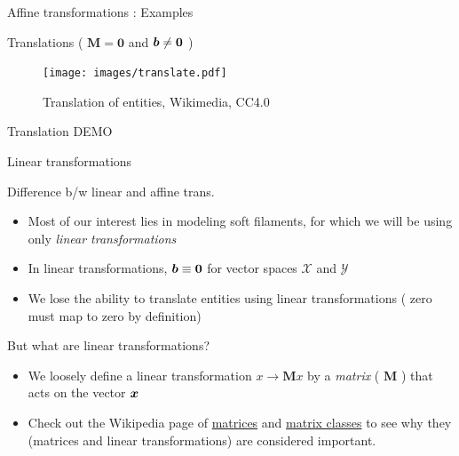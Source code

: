 \documentclass[presentation]{beamer}
\newcommand{\gv}[1]{\ensuremath{\mbox{\boldmath$ #1 $}}}
\newcommand{\bv}[1]{\ensuremath{\mathbf{#1}}}
\begin{document}
\begin{frame}[label={sec:org2a478f3}]{Affine transformations : Examples}
\begin{block}{Translations ( \(\bv{M} = \bv{0}\) and \(\gv{b} \neq \gv{0}\) )}
\begin{figure}[htbp]
\centering
\texttt{[image: images/translate.pdf]}
\caption{Translation of entities, Wikimedia, CC4.0}
\end{figure}
\end{block}
\begin{block}{Translation \alert{DEMO}}
\end{block}
\end{frame}
\begin{frame}[label={sec:orgf21b833}]{Linear transformations}
\begin{block}{Difference b/w linear and affine trans.}
\begin{itemize}
\item Most of our interest lies in modeling soft filaments, for which we will be
using only \emph{linear transformations}
\item In linear transformations, \(\gv{b} \equiv \gv{0}\) for vector spaces \(\mathcal{X}\) and \(\mathcal{Y}\)
\item We lose the ability to translate entities using linear transformations (
zero must map to zero by definition)
\end{itemize}
\end{block}
\end{frame}
\begin{frame}[label={sec:org51c0f19}]{But what are linear transformations?}
\begin{itemize}
\item We loosely define a linear transformation \(x \to \bv{M}x\) by a \emph{matrix}
( \(\bv{M}\) ) that acts on the vector \(\gv{x}\)
\item Check out the Wikipedia page of \href{https://en.wikipedia.org/wiki/Matrix\_(mathematics)}{matrices} and \href{https://en.wikipedia.org/wiki/Rotation\_matrix}{matrix classes} to see why they
(matrices and linear transformations) are considered important.
\end{itemize}
\end{frame}
\end{document}
